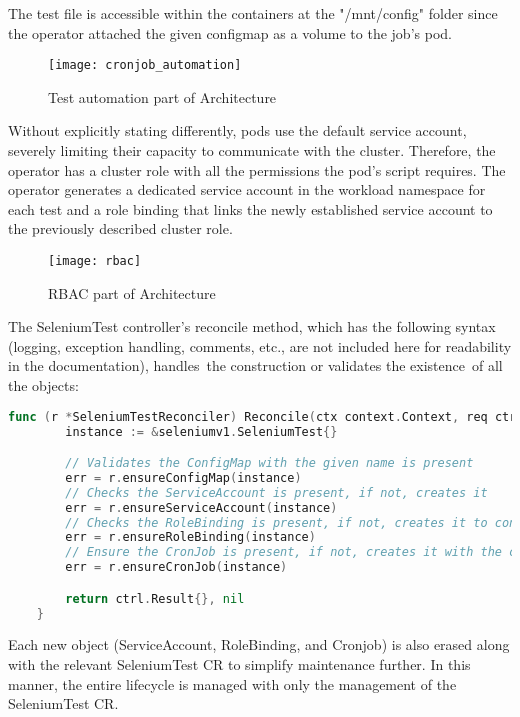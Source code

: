 The test file is accessible within the containers at the "/mnt/config" folder since the operator attached the given configmap as a volume to the job's pod.

\begin{figure}[H]
	\centering
	\texttt{[image: cronjob\_automation]}
	\label{fig:cronjob_automation}
	\caption{Test automation part of Architecture}
\end{figure}

Without explicitly stating differently, pods use the default service account, severely limiting their capacity to communicate with the cluster. Therefore, the operator has a cluster role with all the permissions the pod's script requires. The operator generates a dedicated service account in the workload namespace for each test and a role binding that links the newly established service account to the previously described cluster role.

\begin{figure}[H]
	\centering
	\texttt{[image: rbac]}
	\label{fig:rbac}
	\caption{RBAC part of Architecture}
\end{figure}

The SeleniumTest controller's reconcile method, which has the following syntax (logging, exception handling, comments, etc., are not included here for readability in the documentation), handles the construction or validates the existence of all the objects:
\begin{lstlisting}[language={Go}]
	func (r *SeleniumTestReconciler) Reconcile(ctx context.Context, req ctrl.Request) (ctrl.Result, error) {
		instance := &seleniumv1.SeleniumTest{}

		// Validates the ConfigMap with the given name is present
		err = r.ensureConfigMap(instance)
		// Checks the ServiceAccount is present, if not, creates it
		err = r.ensureServiceAccount(instance)
		// Checks the RoleBinding is present, if not, creates it to connect the service account to the cluster role
		err = r.ensureRoleBinding(instance)
		// Ensure the CronJob is present, if not, creates it with the configmap attached as volume, with the serviceaccount above 
		err = r.ensureCronJob(instance)

		return ctrl.Result{}, nil
	}
\end{lstlisting}

Each new object (ServiceAccount, RoleBinding, and Cronjob) is also erased along with the relevant SeleniumTest CR to simplify maintenance further. In this manner, the entire lifecycle is managed with only the management of the SeleniumTest CR.

